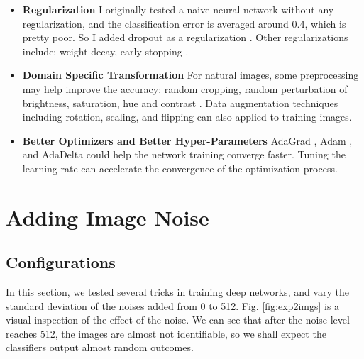 \documentclass[11pt]{article}
\begin{document}
\begin{itemize}
    \item \textbf{Regularization} I originally tested a naive neural network without any regularization, and the classification error is averaged around 0.4, which is pretty poor. So I added dropout as a regularization \cite{srivastava2014dropout}. Other regularizations include: weight decay, early stopping \cite{goodfellow2016deep}.
    \item \textbf{Domain Specific Transformation} For natural images, some preprocessing may help improve the accuracy: random cropping, random perturbation of brightness, saturation, hue and contrast \cite{zhang2016understanding}. Data augmentation techniques including rotation, scaling, and flipping can also applied to training images.
    \item \textbf{Better Optimizers and Better Hyper-Parameters} AdaGrad \cite{duchi2011adaptive}, Adam \cite{kingma2014adam}, and AdaDelta \cite{zeiler2012adadelta} could help the network training converge faster. Tuning the learning rate can accelerate the convergence of the optimization process.
\end{itemize}

\section{Adding Image Noise}
\subsection{Configurations}
In this section, we tested several tricks in training deep networks, and vary the standard deviation of the noises added from 0 to 512. Fig. \ref{fig:exp2imgs} is a visual inspection of the effect of the noise. We can see that after the noise level reaches 512, the images are almost not identifiable, so we shall expect the classifiers output almost random outcomes.
\end{document}
